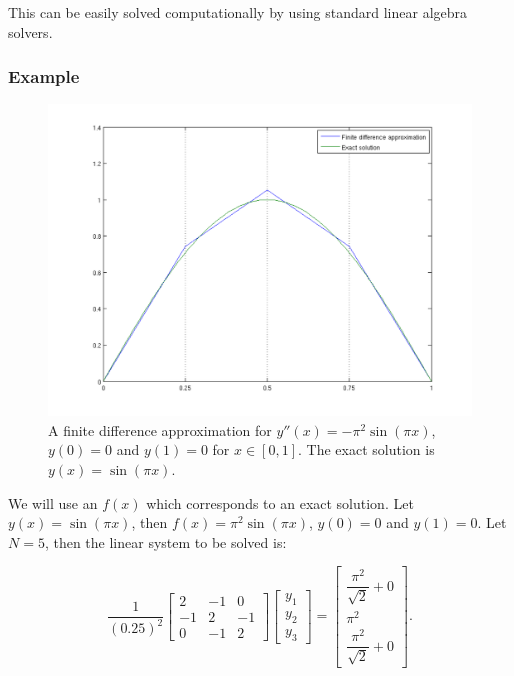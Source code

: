 This can be easily solved computationally by using standard linear algebra solvers.


\subsubsection{Example}

\begin{figure}[!ht]
  \includegraphics[width=1\textwidth]{./images/finitediffexample}
  \caption{A finite difference approximation for $y''(x)=-\pi^{2}\sin(\pi x)$,
    $y(0)=0$ and $y(1)=0$ for $x\in[0,1]$. The exact solution is $y(x)=\sin(\pi x)$.}
  \label{fig:A-finite-difference-example}
\end{figure}

We will use an $f(x)$ which corresponds to an exact solution. Let
$y(x)=\sin(\pi x)$, then $f(x)=\pi^{2}\sin(\pi x)$, $y(0)=0$ and
$y(1)=0$. Let $N=5$, then the linear system to be solved is:

\begin{equation*}
  \dfrac{1}{(0.25)^{2}}\left[
    \begin{array}{ccc}
      2 & -1 & 0\\
      -1 & 2 & -1\\
      0 & -1 & 2
    \end{array}
  \right]\left[
    \begin{array}{c}
      y_{1}\\ y_{2}\\ y_{3}
    \end{array}
  \right] = \left[
    \begin{array}{c}
      \dfrac{\pi^{2}}{\sqrt{2}}+0\\
      \pi^{2}\\
      \dfrac{\pi^{2}}{\sqrt{2}}+0
    \end{array}
  \right].
\end{equation*}

